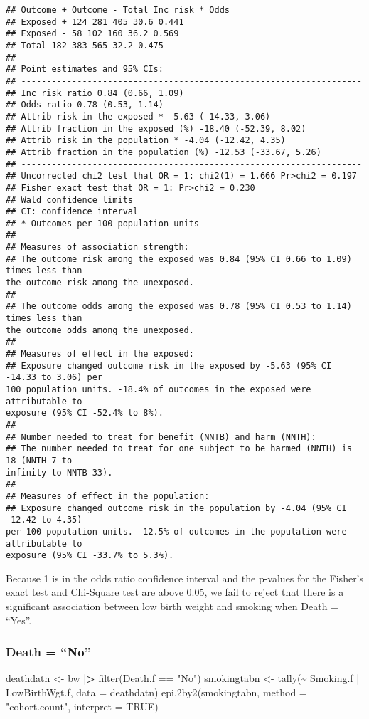 \documentclass[
]{article}
\newenvironment{Shaded}{\begin{snugshade}}{\end{snugshade}}
\newcommand{\AttributeTok}[1]{\textcolor[rgb]{0.77,0.63,0.00}{#1}}
\newcommand{\ConstantTok}[1]{\textcolor[rgb]{0.00,0.00,0.00}{#1}}
\newcommand{\ErrorTok}[1]{\textcolor[rgb]{0.64,0.00,0.00}{\textbf{#1}}}
\newcommand{\FunctionTok}[1]{\textcolor[rgb]{0.00,0.00,0.00}{#1}}
\newcommand{\NormalTok}[1]{#1}
\newcommand{\OtherTok}[1]{\textcolor[rgb]{0.56,0.35,0.01}{#1}}
\newcommand{\SpecialCharTok}[1]{\textcolor[rgb]{0.00,0.00,0.00}{#1}}
\newcommand{\StringTok}[1]{\textcolor[rgb]{0.31,0.60,0.02}{#1}}
\begin{document}
\begin{verbatim}
## Outcome + Outcome - Total Inc risk * Odds
## Exposed + 124 281 405 30.6 0.441
## Exposed - 58 102 160 36.2 0.569
## Total 182 383 565 32.2 0.475
##
## Point estimates and 95% CIs:
## -------------------------------------------------------------------
## Inc risk ratio 0.84 (0.66, 1.09)
## Odds ratio 0.78 (0.53, 1.14)
## Attrib risk in the exposed * -5.63 (-14.33, 3.06)
## Attrib fraction in the exposed (%) -18.40 (-52.39, 8.02)
## Attrib risk in the population * -4.04 (-12.42, 4.35)
## Attrib fraction in the population (%) -12.53 (-33.67, 5.26)
## -------------------------------------------------------------------
## Uncorrected chi2 test that OR = 1: chi2(1) = 1.666 Pr>chi2 = 0.197
## Fisher exact test that OR = 1: Pr>chi2 = 0.230
## Wald confidence limits
## CI: confidence interval
## * Outcomes per 100 population units
##
## Measures of association strength:
## The outcome risk among the exposed was 0.84 (95% CI 0.66 to 1.09) times less than
the outcome risk among the unexposed.
##
## The outcome odds among the exposed was 0.78 (95% CI 0.53 to 1.14) times less than
the outcome odds among the unexposed.
##
## Measures of effect in the exposed:
## Exposure changed outcome risk in the exposed by -5.63 (95% CI -14.33 to 3.06) per
100 population units. -18.4% of outcomes in the exposed were attributable to
exposure (95% CI -52.4% to 8%).
##
## Number needed to treat for benefit (NNTB) and harm (NNTH):
## The number needed to treat for one subject to be harmed (NNTH) is 18 (NNTH 7 to
infinity to NNTB 33).
##
## Measures of effect in the population:
## Exposure changed outcome risk in the population by -4.04 (95% CI -12.42 to 4.35)
per 100 population units. -12.5% of outcomes in the population were attributable to
exposure (95% CI -33.7% to 5.3%).
\end{verbatim}

Because 1 is in the odds ratio confidence interval and the p-values for
the Fisher's exact test and Chi-Square test are above 0.05, we fail to
reject that there is a significant association between low birth weight
and smoking when Death = ``Yes''.

\hypertarget{death-no}{%
\subsubsection{Death = ``No''}\label{death-no}}

\begin{Shaded}
\begin{Highlighting}[]
\NormalTok{deathdatn }\OtherTok{\textless{}{-}}\NormalTok{ bw }\SpecialCharTok{|}\ErrorTok{\textgreater{}} \FunctionTok{filter}\NormalTok{(Death.f }\SpecialCharTok{==} \StringTok{"No"}\NormalTok{)}
\NormalTok{smokingtabn }\OtherTok{\textless{}{-}} \FunctionTok{tally}\NormalTok{(}\SpecialCharTok{\textasciitilde{}}\NormalTok{ Smoking.f }\SpecialCharTok{|}\NormalTok{ LowBirthWgt.f, }\AttributeTok{data =}\NormalTok{ deathdatn)}
\FunctionTok{epi.2by2}\NormalTok{(smokingtabn, }\AttributeTok{method =} \StringTok{"cohort.count"}\NormalTok{, }\AttributeTok{interpret =} \ConstantTok{TRUE}\NormalTok{)}
\end{Highlighting}
\end{Shaded}
\end{document}
